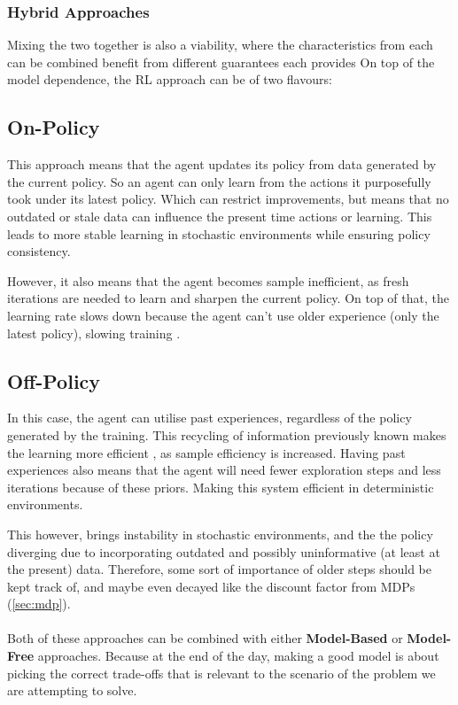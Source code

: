   \subsubsection{Hybrid Approaches}
  Mixing the two together is also a viability, where the characteristics from each can be combined benefit from different guarantees each provides \cite{qu2020combiningmodelbasedmodelfreemethods}
  On top of the model dependence, the RL approach can be of two flavours:

  \subsection{On-Policy}
  This approach means that the agent updates its policy from data generated by the current policy. So an agent can only learn from the actions it purposefully took under its latest policy. Which can restrict improvements, but means that no outdated or stale data can influence the present time actions or learning.
  This leads to more stable learning in stochastic environments  while ensuring policy consistency.

  However, it also means that the agent becomes sample inefficient, as fresh iterations are needed to learn and sharpen the current policy. On top of that, the learning rate slows down because the agent can't use older experience (only the latest policy), slowing training \cite{andrychowicz2020onpolicyRL}.

  \subsection{Off-Policy}
  In this case, the agent can utilise past experiences, regardless of the policy generated by the training. This recycling of information previously known makes the learning more efficient \cite{uehara2022reviewoffpolicyevaluationreinforcement}, as sample efficiency is increased.
  Having past experiences also means that the agent will need fewer exploration steps and less iterations because of these priors. Making this system efficient in deterministic environments. 
  
  This however, brings instability in stochastic environments, and the the policy diverging due to incorporating outdated and possibly uninformative (at least at the present) data. Therefore, some sort of importance of older steps should be kept track of, and maybe even decayed like the discount factor from MDPs (\ref{sec:mdp}). \cite{maroti2019rbed} 
  \\\\
  Both of these approaches can be combined with either \textbf{Model-Based} or \textbf{Model-Free} approaches. Because at the end of the day, making a good model is about picking the correct trade-offs that is relevant to the scenario of the problem we are attempting to solve.
